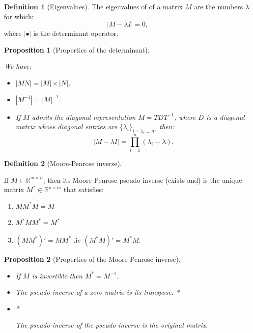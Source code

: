 \documentclass[
  12pt,
]{book}
\providecommand{\tightlist}{%
  \setlength{\itemsep}{0pt}\setlength{\parskip}{0pt}}
\newtheorem{proposition}{Proposition}[chapter]
\theoremstyle{definition}
\newtheorem{definition}{Definition}[chapter]
\theoremstyle{definition}
\theoremstyle{definition}
\theoremstyle{definition}
\theoremstyle{remark}
\begin{document}
\begin{definition}[Eigenvalues]
\protect\hypertarget{def:determinant}{}\label{def:determinant}The eigenvalues of of a matrix \(M\) are the numbers \(\lambda\) for which:
\[
|M - \lambda I| = 0,
\]
where \(| \bullet |\) is the determinant operator.
\end{definition}

\begin{proposition}[Properties of the determinant]
\protect\hypertarget{prp:determinant}{}\label{prp:determinant}

We have:

\begin{itemize}
\tightlist
\item
  \(|MN|=|M|\times|N|\).
\item
  \(|M^{-1}|=|M|^{-1}\).
\item
  If \(M\) admits the diagonal representation \(M=TDT^{-1}\), where \(D\) is a diagonal matrix whose diagonal entries are \(\{\lambda_i\}_{i=1,\dots,n}\), then:
  \[
  |M - \lambda I |=\prod_{i=1}^n (\lambda_i - \lambda).
  \]
\end{itemize}

\end{proposition}

\begin{definition}[Moore-Penrose inverse]
\protect\hypertarget{def:MoorPenrose}{}\label{def:MoorPenrose}

If \(M \in \mathbb{R}^{m \times n}\), then its Moore-Penrose pseudo inverse (exists and) is the unique matrix \(M^* \in \mathbb{R}^{n \times m}\) that satisfies:

\begin{enumerate}
\def\labelenumi{\roman{enumi}.}
\tightlist
\item
  \(M M^* M = M\)
\item
  \(M^* M M^* = M^*\)
\item
  \((M M^*)'=M M^*\)
  .iv \((M^* M)'=M^* M\).
\end{enumerate}

\end{definition}

\begin{proposition}[Properties of the Moore-Penrose inverse]
\protect\hypertarget{prp:MoorPenrose}{}\label{prp:MoorPenrose}

\begin{itemize}
\tightlist
\item
  If \(M\) is invertible then \(M^* = M^{-1}\).
\item
  The pseudo-inverse of a zero matrix is its transpose.
  *

  \item*

  The pseudo-inverse of the pseudo-inverse is the original matrix.
\end{itemize}

\end{proposition}
\end{document}
